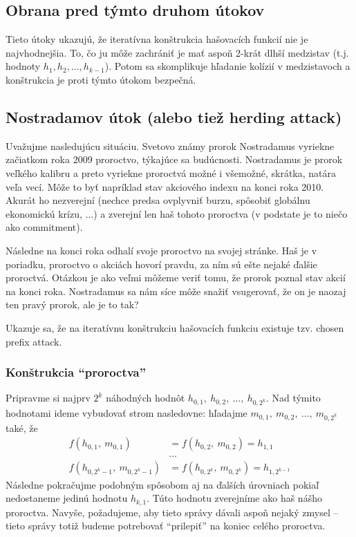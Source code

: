 \subsection{Obrana pred týmto druhom útokov}
Tieto útoky ukazujú, že iteratívna konštrukcia hašovacích funkcií nie je najvhodnejšia.
To, čo ju môže zachrániť je mať aspoň 2-krát dlhší medzistav 
(t.j. hodnoty $h_1, h_2, \dots, h_{k-1}$). Potom sa skomplikuje hľadanie
kolízií v medzistavoch a konštrukcia je proti týmto útokom bezpečná.

\subsection{Nostradamov útok (alebo tiež herding attack)}

Uvažujme nasledujúcu situáciu. Svetovo známy prorok Nostradamus
vyriekne začiatkom roka 2009 proroctvo, týkajúce sa budúcnosti.
Nostradamus je prorok veľkého kalibru a preto vyriekne proroctvá
možné i všemožné, skrátka, natára veľa vecí.
Môže to byť napríklad stav akciového indexu na konci roka 2010.
Akurát ho nezverejní (nechce predsa ovplyvniť burzu, spôsobiť globálnu
ekonomickú krízu, ...) a zverejní len haš tohoto proroctva 
(v podstate je to niečo ako commitment).

Následne na konci roka odhalí svoje proroctvo na svojej stránke.
Haš je v poriadku, proroctvo
o akciách hovorí pravdu, za ním sú ešte nejaké ďalšie proroctvá.
Otázkou je ako veľmi môžeme veriť tomu, že prorok poznal stav
akcií na konci roka. Nostradamus sa nám síce môže snažiť vsugerovať,
že on je naozaj ten pravý prorok, ale je to tak?

Ukazuje sa, že na iteratívnu konštrukciu
hašovacích funkciu existuje tzv. chosen prefix attack.

\subsubsection{Konštrukcia ``proroctva''}

Pripravme si najprv $2^k$ náhodných hodnôt 
$h_{0,1},\ h_{0,2},\ \dots,\ h_{0,2^k}$.
Nad týmito hodnotami ideme vybudovať strom nasledovne:
hľadajme $m_{0,1},\ m_{0,2},\ \dots,\ m_{0,2^k}$ také, že
\begin{align*}
    f(h_{0,1},\ m_{0,1}) &= f(h_{0,2},\ m_{0,2}) = h_{1,1} \\
  &  \dots \\
    f(h_{0,2^k-1},\ m_{0,2^k-1}) &= f(h_{0,2^k},\ m_{0,2^k}) = h_{1,
        2^{k-1}} 
\end{align*}
Následne pokračujme podobným spôsobom aj na ďalších úrovniach
pokiaľ nedostaneme jedinú hodnotu $h_{k,1}$.
Túto hodnotu zverejníme ako haš nášho proroctva.
Navyše, požadujeme, aby tieto správy dávali aspoň nejaký zmysel --
tieto správy totiž budeme potrebovať ``prilepiť'' na koniec celého
proroctva.

